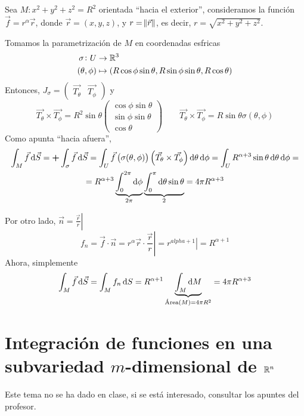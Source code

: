 \begin{example*}
    Sea $M : x^2 + y^2 + z^2 = R^2$ orientada ``hacia el exterior'', consideramos la función $\vec{f} = r^\alpha \vec{r}$, donde
    $\vec{r} = (x,y,z)$, y $r = \norm{\vec{r}}$, es decir, $r = \sqrt{x^2 + y^2 + z^2}$.

    Tomamos la parametrización de $M$ en coordenadas esfricas
    \[
        \begin{aligned}
            \sigma \colon U &\to \mathbb{R}^3 \\
            (\theta, \phi) &\mapsto \left( R \cos \phi \sin \theta, R\sin \phi \sin \theta, R\cos \theta \right)
        \end{aligned}
    \]
    Entonces, $J_\sigma = \begin{pmatrix} \vec{T_\theta} & \vec{T_\phi} \end{pmatrix}$ y
    \[
        \vec{T_\theta} \times \vec{T_\phi} = R^2 \sin\theta
        \begin{pmatrix}
            \cos\phi\sin\theta \\ \sin\phi\sin\theta \\ \cos\theta
        \end{pmatrix} \qquad
        \vec{T_\theta} \times \vec{T_\phi} = R \sin\theta \sigma(\theta, \phi)
    \]
    Como apunta ``hacia afuera'', 
    \begin{gather*}
        \int_M \vec{f} \dif \vec{S} = \textbf{+} \int_\sigma \vec{f} \dif \vec{S} = 
        \int_U \vec{f} \left( \sigma(\theta, \phi)\right) \left( \vec{T_\theta} \times \vec{T_\phi} \right) \dif \theta \dif \phi =
        \int_U R^{\alpha+3} \sin \theta \dif \theta \dif \phi =\\= R^{\alpha+3} \underbrace{\int^{2\pi}_0 \dif \phi}_{2\pi}
        \underbrace{ \int^\pi_0 \dif \theta \sin \theta }_{2} = 4\pi R^{\alpha+3}
    \end{gather*}

    Por otro lado, $\vec{n} = \left. \frac{\vec{r}}{r} \right\vert$
    \[
        f_n = \vec{f} \cdot \vec{n} = r^{\alpha} \vec{r} \cdot \left.\frac{\vec{r}}{r}\right\vert = \left. r^{alpha+1}\right\vert = R^{\alpha+1}
    \]
    Ahora, simplemente
    \[
        \int_M \vec{f} \dif \vec{S} = \int_M f_n \dif S = R^{\alpha+1} \underbrace{\int_M \dif M}_{\text{Área}(M) = 4\pi R^2} = 4\pi R^{\alpha+3}
    \]
\end{example*}

\section{Integración de funciones en una subvariedad $m$-dimensional de $\mathbb{R}^n$}

Este tema no se ha dado en clase, si se está interesado, consultar los apuntes del profesor.
